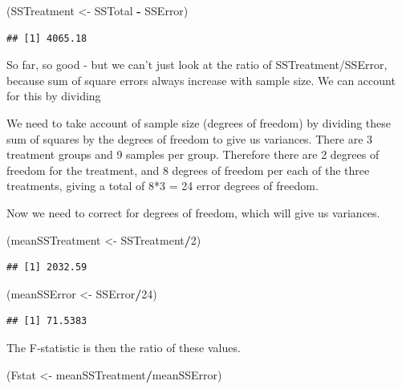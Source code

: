 \documentclass[
  a4paperpaper,
]{book}
\newenvironment{Shaded}{\begin{snugshade}}{\end{snugshade}}
\newcommand{\DecValTok}[1]{\textcolor[rgb]{0.00,0.00,0.81}{#1}}
\newcommand{\NormalTok}[1]{#1}
\newcommand{\OperatorTok}[1]{\textcolor[rgb]{0.81,0.36,0.00}{\textbf{#1}}}
\newcommand{\StringTok}[1]{\textcolor[rgb]{0.31,0.60,0.02}{#1}}
\begin{document}
\begin{Shaded}
\begin{Highlighting}[]
\NormalTok{(SSTreatment \textless{}{-}}\StringTok{ }\NormalTok{SSTotal }\OperatorTok{{-}}\StringTok{ }\NormalTok{SSError)}
\end{Highlighting}
\end{Shaded}

\begin{verbatim}
## [1] 4065.18
\end{verbatim}

So far, so good - but we can't just look at the ratio of SSTreatment/SSError, because sum of square errors always increase with sample size. We can account for this by dividing

We need to take account of sample size (degrees of freedom) by dividing these sum of squares by the degrees of freedom to give us variances. There are 3 treatment groups and 9 samples per group. Therefore there are 2 degrees of freedom for the treatment, and 8 degrees of freedom per each of the three treatments, giving a total of 8*3 = 24 error degrees of freedom.

Now we need to correct for degrees of freedom, which will give us variances.

\begin{Shaded}
\begin{Highlighting}[]
\NormalTok{(meanSSTreatment \textless{}{-}}\StringTok{ }\NormalTok{SSTreatment}\OperatorTok{/}\DecValTok{2}\NormalTok{)}
\end{Highlighting}
\end{Shaded}

\begin{verbatim}
## [1] 2032.59
\end{verbatim}

\begin{Shaded}
\begin{Highlighting}[]
\NormalTok{(meanSSError \textless{}{-}}\StringTok{ }\NormalTok{SSError}\OperatorTok{/}\DecValTok{24}\NormalTok{)}
\end{Highlighting}
\end{Shaded}

\begin{verbatim}
## [1] 71.5383
\end{verbatim}

The F-statistic is then the ratio of these values.

\begin{Shaded}
\begin{Highlighting}[]
\NormalTok{(Fstat \textless{}{-}}\StringTok{ }\NormalTok{meanSSTreatment}\OperatorTok{/}\NormalTok{meanSSError)}
\end{Highlighting}
\end{Shaded}
\end{document}
